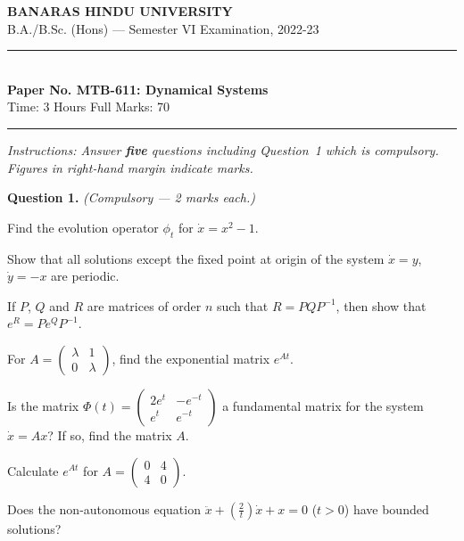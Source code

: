 \documentclass[11pt,a4paper]{article}
\begin{document}
\begin{center}
  {\large\bfseries BANARAS HINDU UNIVERSITY}\\[2pt]
  {\normalsize B.A./B.Sc. (Hons) --- Semester VI Examination, 2022-23}\\[6pt]
  \rule{0.8\linewidth}{0.5pt}\\[6pt]
  {\large\bfseries Paper No. MTB-611: Dynamical Systems}\\[4pt]
  {\normalsize Time: 3 Hours \hfill Full Marks: 70}
\end{center}
\rule{\linewidth}{0.4pt}
\smallskip



\noindent   \textit{Instructions: Answer   \textbf{five} questions including Question~1 which is compulsory. Figures in right-hand margin indicate marks.}
\bigskip




\noindent   \textbf{Question 1.}   \textit{(Compulsory --- 2 marks each.)}

\begin{parts}
  \item Find the evolution operator $\phi_t$ for $\dot{x} = x^2 - 1$.
  \item Show that all solutions except the fixed point at origin of the system $\dot{x} = y$, $\dot{y} = -x$ are periodic.
  \item If $P$, $Q$ and $R$ are matrices of order $n$ such that $R = P Q P^{-1}$, then show that $e^R = P e^Q P^{-1}$.
  \item For $A = 
\begin{pmatrix} \lambda & 1 \\ 0 & \lambda \end{pmatrix}$, find the exponential matrix $e^{At}$.
  \item Is the matrix $\Phi(t) = 
\begin{pmatrix} 2e^t & -e^{-t} \\ e^t & e^{-t} \end{pmatrix}$ a fundamental matrix for the system $\dot{x} = Ax$? If so, find the matrix $A$.
  \item Calculate $e^{At}$ for $A = 
\begin{pmatrix} 0 & 4 \\ 4 & 0 \end{pmatrix}$.
  \item Does the non-autonomous equation $\ddot{x} + \left(\frac{2}{t}\right)\dot{x} + x = 0$ ($t > 0$) have bounded solutions?
\end{parts}
\end{document}
